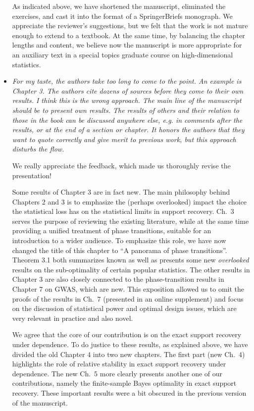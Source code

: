 \documentclass[11pt]{article}
\begin{document}
\begin{itemize}
     As indicated above, we have shortened the manuscript, eliminated the exercises, and cast it into the format of a SpringerBriefs monograph.  We 
     appreciate the reviewer's suggestions, but we felt that the work is not mature enough to extend to a textbook. At the same time, by balancing the
     chapter lengths and content, we believe now the manuscript is more appropriate for an auxiliary text in a special topics graduate course on 
     high-dimensional statistics.
     
     
     \item {\em For my taste, the authors take too long to come to the point. An example is Chapter 3. The authors cite dozens of sources before they come to their own results. I think this is the wrong approach. The main line of the manuscript should be to present own results. The results of others and their relation to those in the book can be discussed anywhere else, e.g. in comments after the results, or at the end of a section or chapter. It honors the authors that they want to quote correctly and give merit to previous work, but this approach disturbs the flow.}
     
     We really appreciate the feedback, which made us thoroughly revise the presentation!
     
     Some results of Chapter 3 are in fact new.  The main philosophy behind Chapters 2 and 3 is to emphasize the (perhaps 
     overlooked) impact the choice the statistical loss has on the statistical limits in support recovery.    Ch.\ 3 serves the purpose of reviewing 
     the existing literature, while at the same time providing a unified treatment of phase transitions, suitable for an introduction to a wider audience.  
     To emphasize this  role, we have now changed the title of this chapter to ``A panorama of phase transitions''.  Theorem 3.1 both summarizes known as well as presents 
     some new {\em overlooked} results on the sub-optimality of certain popular statistics.  The other results in Chapter 3 are also closely connected to the 
    phase-transition results in Chapter 7 on GWAS, which are new.  This exposition allowed us to omit the proofs of the results in Ch.\ 7 (presented in an 
    online supplement) and focus on the discussion of statistical power and optimal design issues, which are very relevant in practice and also novel. 
     
     We agree that the core of our contribution is on the exact support recovery under dependence.  To do justice to these results, as explained above, 
     we have divided the old Chapter 4 into two new chapters.  The first part (new Ch.\ 4) highlights the role of relative stability in exact support recovery 
     under dependence. The new Ch.\ 5 more clearly presents another one of our contributions, namely the finite-sample Bayes optimality in 
     exact support recovery.  These important results were a bit obscured in the previous version of the manuscript.  
     

\end{itemize}
\end{document}
